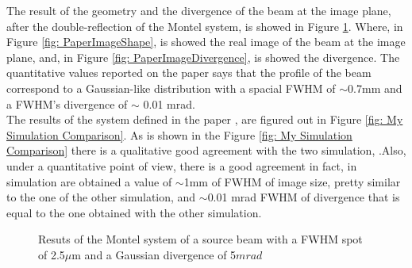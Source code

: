 The result of the geometry and the divergence of the beam at the image plane, after the double-reflection of the Montel system, is showed in Figure \ref{fig: PaperResults}. Where, in Figure \ref{fig: PaperImageShape}, is showed the real image of the beam at the image plane, and, in Figure \ref{fig: PaperImageDivergence}, is showed the divergence. The quantitative values reported on the paper says that the profile of the beam correspond to a Gaussian-like distribution with a spacial FWHM of $\sim $0.7mm and a FWHM's divergence of $\sim $ 0.01 mrad.
\\
The results of the system defined in the paper \cite{resta2015nested}, are figured out in Figure \ref{fig: My Simulation Comparison}. As is shown in the Figure \ref{fig: My Simulation Comparison} there is a qualitative good agreement with the two simulation, .Also, under a quantitative point of view, there is a good agreement in fact, in simulation are obtained a value of $\sim $1mm of FWHM of image size, pretty similar to the one of the other simulation, and $\sim $0.01 mrad FWHM of divergence that is equal to the one obtained with the other simulation.

\begin{figure}[H]
%
\centering
%
\quad
%
%
\caption{Resuts of the Montel system of a source beam with a FWHM spot of 2.5$\mu $m and a Gaussian divergence of 5$mrad $}
%
\label{fig: PaperResults}
%
\end{figure}

